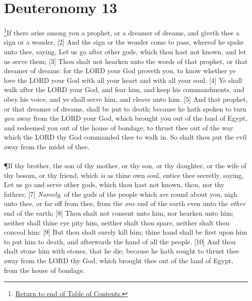 \chapter{Deuteronomy 13}
\footnote{\textcolor[rgb]{0.00,0.25,0.00}{\hyperlink{DeuteronomyTOC}{Return to end of Table of Contents.}}}\textcolor[rgb]{0.00,0.00,1.00}{If there arise among you a prophet, or a dreamer of dreams, and giveth thee a sign or a wonder,}
[2] \textcolor[rgb]{0.00,0.00,1.00}{And the sign or the wonder come to pass, whereof he spake unto thee, saying, Let us go after other gods, which thou hast not known, and let us serve them;}
[3] \textcolor[rgb]{0.00,0.00,1.00}{Thou shalt not hearken unto the words of that prophet, or that dreamer of dreams: for the LORD your God proveth you, to know whether ye love the LORD your God with all your heart and with all your soul.}
[4] \textcolor[rgb]{0.00,0.00,1.00}{Ye shall walk after the LORD your God, and fear him, and keep his commandments, and obey his voice, and ye shall serve him, and cleave unto him.}
[5] \textcolor[rgb]{0.00,0.00,1.00}{And that prophet, or that dreamer of dreams, shall be put to death; because he hath spoken to turn \emph{you} away from the LORD your God, which brought you out of the land of Egypt, and redeemed you out of the house of bondage, to thrust thee out of the way which the LORD thy God commanded thee to walk in. So shalt thou put the evil away from the midst of thee.}\\
\\
\P  \textcolor[rgb]{0.00,0.00,1.00}{If thy brother, the son of thy mother, or thy son, or thy daughter, or the wife of thy bosom, or thy friend, which \emph{is} as thine own soul, entice thee secretly, saying, Let us go and serve other gods, which thou hast not known, thou, nor thy fathers;}
[7] \textcolor[rgb]{0.00,0.00,1.00}{\emph{Namely}, of the gods of the people which \emph{are} round about you, nigh unto thee, or far off from thee, from the \emph{one} end of the earth even unto the \emph{other} end of the earth;}
[8] \textcolor[rgb]{0.00,0.00,1.00}{Thou shalt not consent unto him, nor hearken unto him; neither shall thine eye pity him, neither shalt thou spare, neither shalt thou conceal him:}
[9] \textcolor[rgb]{0.00,0.00,1.00}{But thou shalt surely kill him; thine hand shall be first upon him to put him to death, and afterwards the hand of all the people.}
[10] \textcolor[rgb]{0.00,0.00,1.00}{And thou shalt stone him with stones, that he die; because he hath sought to thrust thee away from the LORD thy God, which brought thee out of the land of Egypt, from the house of bondage.}
